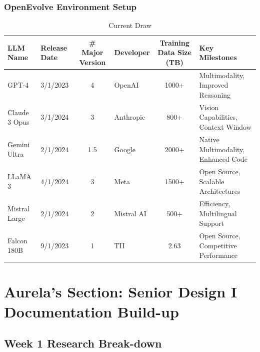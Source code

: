 \documentclass[11pt,letterpaper]{article}
\begin{document}
\subsubsection{OpenEvolve Environment Setup}
\begin{table}[H]
\fontsize{11}{11}\selectfont
\centering
\caption*{Current Draw}
\vspace{-7pt}
\begin{tabularx}{\textwidth}{l|l|c|l|c|X}
\toprule
\textbf{LLM Name} & \textbf{Release Date} & \textbf{\# Major Version} & \textbf{Developer} & \textbf{Training Data Size (TB)} & \textbf{Key Milestones} \\
\midrule
GPT-4 & 3/1/2023 & 4 & OpenAI & 1000+ & Multimodality, Improved Reasoning \\
Claude 3 Opus & 3/1/2024 & 3 & Anthropic & 800+ & Vision Capabilities, Context Window \\
Gemini Ultra & 2/1/2024 & 1.5 & Google & 2000+ & Native Multimodality, Enhanced Code \\
LLaMA 3 & 4/1/2024 & 3 & Meta & 1500+ & Open Source, Scalable Architectures \\
Mistral Large & 2/1/2024 & 2 & Mistral AI & 500+ & Efficiency, Multilingual Support \\
Falcon 180B & 9/1/2023 & 1 & TII & 2.63 & Open Source, Competitive Performance \\
\midrule
\bottomrule
\end{tabularx}
\end{table}
\newpage

\section{Aurela's Section: Senior Design I Documentation Build-up}
\subsection{Week 1 Research Break-down}
\end{document}
